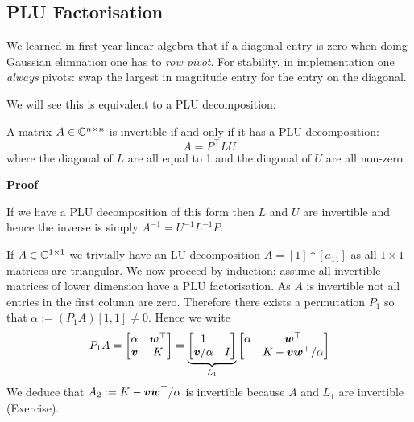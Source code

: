 \subsection{PLU Factorisation}
We learned in first year linear algebra that if a diagonal entry is zero when doing Gaussian elimnation one has to \emph{row pivot}. For stability,  in implementation one \emph{always} pivots: swap the largest in magnitude entry for the entry on the diagonal.

We will see this is equivalent to a PLU decomposition:

\begin{theorem}[PLU] A matrix $A \in {\mathbb C}^{n \times n}$ is invertible if and only if it has a PLU decomposition:
\[
A = P^\ensuremath{\top} L U
\]
where the diagonal of $L$ are all equal to 1 and the diagonal of $U$ are all non-zero.

\end{theorem}
\textbf{Proof}

If we have a PLU decomposition of this form then $L$ and $U$ are invertible and hence the inverse is simply $A^{-1} = U^{-1} L^{-1} P$. 

If $A \in {\mathbb C}^{1 \times 1}$ we trivially have an LU decomposition $A = [1] * [a_{11}]$ as all $1 \ensuremath{\times} 1$ matrices are triangular. We now proceed by induction: assume all invertible matrices of lower dimension have a PLU factorisation. As $A$ is invertible not all entries in the first column are zero. Therefore there exists a permutation $P_1$ so that $\ensuremath{\alpha} := (P_1 A)[1,1] \ensuremath{\neq} 0$. Hence we write
\[
P_1 A = \begin{bmatrix} \alpha & \bm{{\mbox{\boldmath$w$\unboldmath}}}^\top \\
                        \bm{{\mbox{\boldmath$v$\unboldmath}}} & K
                        \end{bmatrix} = \underbrace{\begin{bmatrix}
1 \\
\bm{{\mbox{\boldmath$v$\unboldmath}}}/\alpha & I \end{bmatrix}}_{L_1}  \begin{bmatrix} \alpha & \bm{{\mbox{\boldmath$w$\unboldmath}}}^\top \\  & K - \bm{{\mbox{\boldmath$v$\unboldmath}}} \bm{{\mbox{\boldmath$w$\unboldmath}}}^\top/\alpha \end{bmatrix}
\]
We deduce that $A_2 := K - \bm{{\mbox{\boldmath$v$\unboldmath}}} \bm{{\mbox{\boldmath$w$\unboldmath}}}^\top/\alpha$ is invertible because $A$ and $L_1$ are invertible (Exercise).

